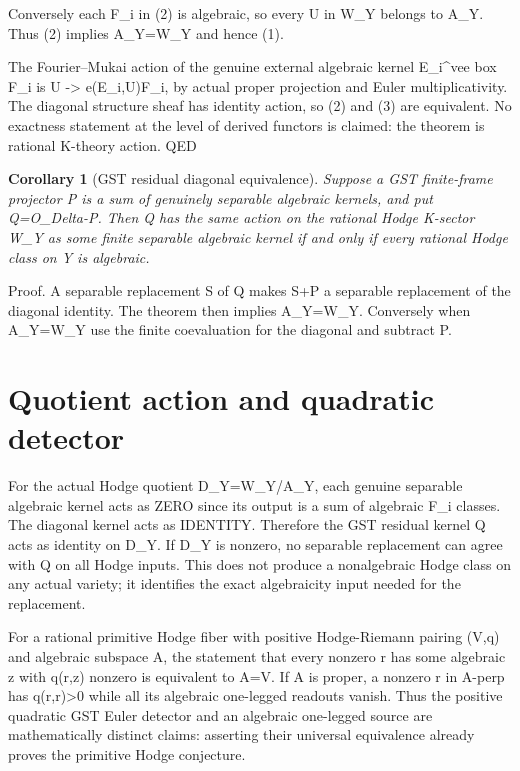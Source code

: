 \documentclass{article}
\newtheorem{corollary}[theorem]{Corollary}
\begin{document}
Conversely each F_i in (2) is algebraic,
so every U in W_Y belongs to A_Y.
Thus (2) implies A_Y=W_Y and hence (1).

The Fourier--Mukai action of the genuine
external algebraic kernel E_i^vee box F_i
is U -> e(E_i,U)F_i, by actual proper
projection and Euler multiplicativity.
The diagonal structure sheaf has identity
action, so (2) and (3) are equivalent.
No exactness statement at the level
of derived functors is claimed:
the theorem is rational K-theory action.
\hfill QED

\begin{corollary}[GST residual diagonal equivalence]
Suppose a GST finite-frame projector
P is a sum of genuinely separable
algebraic kernels, and put Q=O_Delta-P.
Then Q has the same action on the
rational Hodge K-sector W_Y as some
finite separable algebraic kernel
if and only if every rational Hodge
class on Y is algebraic.
\end{corollary}
\noindent Proof.
A separable replacement S of Q makes
S+P a separable replacement of the
diagonal identity. The theorem then
implies A_Y=W_Y. Conversely when
A_Y=W_Y use the finite coevaluation for
the diagonal and subtract P.

\section*{Quotient action and quadratic detector}
For the actual Hodge quotient D_Y=W_Y/A_Y,
each genuine separable algebraic
kernel acts as ZERO since its output is
a sum of algebraic F_i classes.
The diagonal kernel acts as IDENTITY.
Therefore the GST residual kernel Q
acts as identity on D_Y. If D_Y is
nonzero, no separable replacement can
agree with Q on all Hodge inputs.
This does not produce a nonalgebraic
Hodge class on any actual variety;
it identifies the exact algebraicity
input needed for the replacement.

For a rational primitive Hodge fiber with
positive Hodge-Riemann pairing (V,q)
and algebraic subspace A,
the statement that every nonzero r has
some algebraic z with q(r,z) nonzero
is equivalent to A=V.
If A is proper, a nonzero r in A-perp
has q(r,r)>0 while all its algebraic
one-legged readouts vanish.
Thus the positive quadratic GST Euler
detector and an algebraic one-legged
source are mathematically distinct
claims: asserting their universal
equivalence already proves the
primitive Hodge conjecture.
\end{document}
